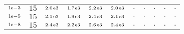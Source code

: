 \begin{tiny}
\begin{tabular}{@{$\;$}c@{$\;$}|@{$\;$}c@{$\;$}@{$\;$}c@{$\;$}@{$\;$}c@{$\;$}@{$\;$}c@{$\;$}@{$\;$}c@{$\;$}|@{$\;$}c@{$\;$}@{$\;$}c@{$\;$}@{$\;$}c@{$\;$}@{$\;$}c@{$\;$}@{$\;$}c@{$\;$}}
$\scriptstyle1\!\mathrm{\hspace{0.10em}e}-3$ & $\scriptstyle15$ & $\scriptstyle2.0\mathrm{\hspace{0.10em}e}3$ & $\scriptstyle1.7\mathrm{\hspace{0.10em}e}3$ & $\scriptstyle2.2\mathrm{\hspace{0.10em}e}3$ & $\scriptstyle2.0\mathrm{\hspace{0.10em}e}3$ & $\scriptstyle.$ & $\scriptstyle.$ & $\scriptstyle.$ & $\scriptstyle.$ & $\scriptstyle.$\\ 
$\scriptstyle1\!\mathrm{\hspace{0.10em}e}-5$ & $\scriptstyle15$ & $\scriptstyle2.1\mathrm{\hspace{0.10em}e}3$ & $\scriptstyle1.9\mathrm{\hspace{0.10em}e}3$ & $\scriptstyle2.4\mathrm{\hspace{0.10em}e}3$ & $\scriptstyle2.1\mathrm{\hspace{0.10em}e}3$ & $\scriptstyle.$ & $\scriptstyle.$ & $\scriptstyle.$ & $\scriptstyle.$ & $\scriptstyle.$\\ 
$\scriptstyle1\!\mathrm{\hspace{0.10em}e}-8$ & $\scriptstyle15$ & $\scriptstyle2.4\mathrm{\hspace{0.10em}e}3$ & $\scriptstyle2.2\mathrm{\hspace{0.10em}e}3$ & $\scriptstyle2.6\mathrm{\hspace{0.10em}e}3$ & $\scriptstyle2.4\mathrm{\hspace{0.10em}e}3$ & $\scriptstyle.$ & $\scriptstyle.$ & $\scriptstyle.$ & $\scriptstyle.$ & $\scriptstyle.$\\ 
\end{tabular} 
\end{tiny} 
